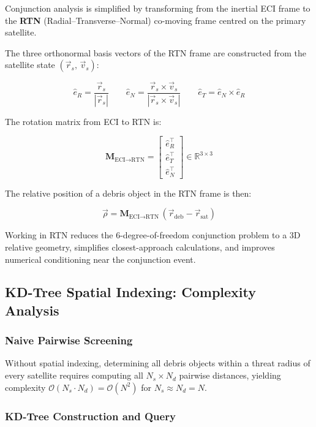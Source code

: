 \documentclass[11pt, a4paper]{article}
\newcommand{\keyword}[1]{\textcolor{orbitcyan}{\textbf{#1}}}
\begin{document}
Conjunction analysis is simplified by transforming from the inertial ECI frame to the
\keyword{RTN} (Radial--Transverse--Normal) co-moving frame centred on the primary satellite.

The three orthonormal basis vectors of the RTN frame are constructed from the satellite
state $(\vec{r}_s,\, \vec{v}_s)$:

\[
  \hat{e}_R = \frac{\vec{r}_s}{|\vec{r}_s|}
  \qquad
  \hat{e}_N = \frac{\vec{r}_s \times \vec{v}_s}{|\vec{r}_s \times \vec{v}_s|}
  \qquad
  \hat{e}_T = \hat{e}_N \times \hat{e}_R
\]

The rotation matrix from ECI to RTN is:

\[
  \mathbf{M}_{\text{ECI}\to\text{RTN}} =
  \begin{bmatrix}
    \hat{e}_R^\top \\[2pt]
    \hat{e}_T^\top \\[2pt]
    \hat{e}_N^\top
  \end{bmatrix}
  \in \mathbb{R}^{3\times 3}
\]

The relative position of a debris object in the RTN frame is then:

\[
  \vec{\rho} = \mathbf{M}_{\text{ECI}\to\text{RTN}}\,\left(\vec{r}_{\text{deb}} - \vec{r}_{\text{sat}}\right)
\]

Working in RTN reduces the 6-degree-of-freedom conjunction problem to a 3D relative geometry,
simplifies closest-approach calculations, and improves numerical conditioning near the conjunction
event.

\subsection{KD-Tree Spatial Indexing: Complexity Analysis}

\subsubsection{Naive Pairwise Screening}

Without spatial indexing, determining all debris objects within a threat radius of every
satellite requires computing all $N_s \times N_d$ pairwise distances, yielding complexity
$\mathcal{O}(N_s \cdot N_d) = \mathcal{O}(N^2)$ for $N_s \approx N_d = N$.

\subsubsection{KD-Tree Construction and Query}
\end{document}
